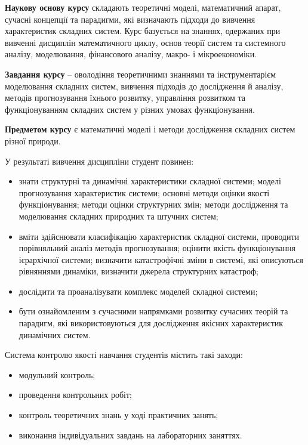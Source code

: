 \documentclass[
  letterpaper,
]{report}
\providecommand{\tightlist}{%
  \setlength{\itemsep}{0pt}\setlength{\parskip}{0pt}}\usepackage{longtable,booktabs,array}
\begin{document}
\textbf{Наукову основу курсу} складають теоретичні моделі, математичний
апарат, сучасні концепції та парадигми, які визначають підходи до
вивчення характеристик складних систем. Курс базується на знаннях,
одержаних при вивченні дисциплін математичного циклу, основ теорії
систем та системного аналізу, моделювання, фінансового аналізу, макро- і
мікроекономіки.

\textbf{Завдання курсу} -- оволодіння теоретичними знаннями та
інструментарієм моделювання складних систем, вивчення підходів до
дослідження й аналізу, методів прогнозування їхнього розвитку,
управління розвитком та функціонуванням складних систем у різних умовах
функціонування.

\textbf{Предметом курсу} є математичні моделі і методи дослідження
складних систем різної природи.

У результаті вивчення дисципліни студент повинен:

\begin{itemize}
\item
  знати структурні та динамічні характеристики складної системи; моделі
  прогнозування характеристик системи; основні методи оцінки якості
  функціонування; методи оцінки структурних змін; методи дослідження та
  моделювання складних природних та штучних систем;
\item
  вміти здійснювати класифікацію характеристик складної системи,
  проводити порівняльний аналіз методів прогнозування; оцінити якість
  функціонування ієрархічної системи; визначити катастрофічні зміни в
  системі, які описуються рівняннями динаміки, визначити джерела
  структурних катастроф;
\item
  дослідити та проаналізувати комплекс моделей складної системи;
\item
  бути ознайомленим з сучасними напрямками розвитку сучасних теорій та
  парадигм, які використовуються для дослідження якісних характеристик
  динамічних систем.
\end{itemize}

Система контролю якості навчання студентів містить такі заходи:

\begin{itemize}
\tightlist
\item
  модульний контроль;
\item
  проведення контрольних робіт;
\item
  контроль теоретичних знань у ході практичних занять;
\item
  виконання індивідуальних завдань на лабораторних заняттях.
\end{itemize}
\end{document}
